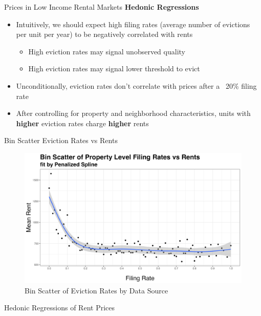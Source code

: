 \documentclass[10pt, xcolor=dvipsnames]{beamer}
\begin{document}
\begin{frame}{Prices in Low Income Rental Markets}
\textbf{Hedonic Regressions}
    \begin{itemize}
    \item Intuitively, we should expect high filing rates (average number of evictions per unit per year) to be negatively correlated with rents
    \begin{itemize}
        \item High eviction rates may signal unobserved quality
        \item High eviction rates may signal lower threshold to evict
    \end{itemize}
    \pause
        \item Unconditionally, eviction rates don't correlate with prices after a ~20\% filing rate
        \pause
        \item After controlling for property and neighborhood characteristics, units with \textbf{higher} eviction rates charge \textbf{higher} rents 
    \end{itemize}
\end{frame}

\begin{frame}{Bin Scatter Eviction Rates vs Rents}
    \begin{figure}
        \centering
        \includegraphics[width=0.75\linewidth]{figs/philadelphia_filing_rate_rent_scatter.png}
        \caption{Bin Scatter of Eviction Rates by Data Source}
        \label{fig:bin-scatter}
    \end{figure}
\end{frame}

\begin{frame}{Hedonic Regressions of Rent Prices}
    \begin{center}
    \Tiny
        
    \end{center}
\end{frame}
\end{document}
